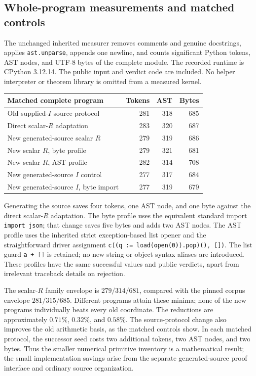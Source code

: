\documentclass[11pt,letterpaper]{article}
\theoremstyle{definition}\newtheorem{definition}[theorem]{Definition}
\theoremstyle{remark}\newtheorem{remark}[theorem]{Remark}
\begin{document}
\subsection{Whole-program measurements and matched controls}

The unchanged inherited measurer removes comments and genuine
docstrings, applies \texttt{ast.unparse}, appends one newline, and counts
significant Python tokens, AST nodes, and UTF-8 bytes of the complete
module. The recorded runtime is CPython 3.12.14. The public input and
verdict code are included. No helper interpreter or theorem library is
omitted from a measured kernel.

\begin{center}\small
\begin{tabular}{lrrr}
\toprule
Matched complete program & Tokens & AST & Bytes\\
\midrule
Old supplied-$I$ source protocol &281&318&685\\
Direct scalar-$R$ adaptation &283&320&687\\
New generated-source scalar $R$ &279&319&686\\
New scalar $R$, byte profile &279&321&681\\
New scalar $R$, AST profile &282&314&708\\
\midrule
New generated-source $I$ control &277&317&684\\
New generated-source $I$, byte import &277&319&679\\
\bottomrule
\end{tabular}
\end{center}

Generating the source saves four tokens, one AST node, and one byte
against the direct scalar-$R$ adaptation. The byte profile uses the
equivalent standard import \texttt{import json}; that change saves five
bytes and adds two AST nodes. The AST profile uses the inherited strict
exception-based list opener and the straightforward driver assignment
\texttt{c((q := load(open(0)).pop)(), [])}. The list guard
\texttt{a + []} is retained; no new string or object syntax aliases are
introduced. These profiles have the same successful values and public
verdicts, apart from irrelevant traceback details on rejection.

The scalar-$R$ family envelope is $279/314/681$, compared with the pinned
corpus envelope $281/315/685$. Different programs attain these minima;
none of the new programs individually beats every old coordinate.
The reductions are approximately $0.71\%$, $0.32\%$, and $0.58\%$.
The source-protocol change also improves the old arithmetic basis, as
the matched controls show. In each matched protocol, the successor
seed costs two additional tokens, two AST nodes, and two bytes. Thus
the smaller numerical primitive inventory is a mathematical result;
the small implementation savings arise from the separate generated-source
proof interface and ordinary source organization.
\end{document}
